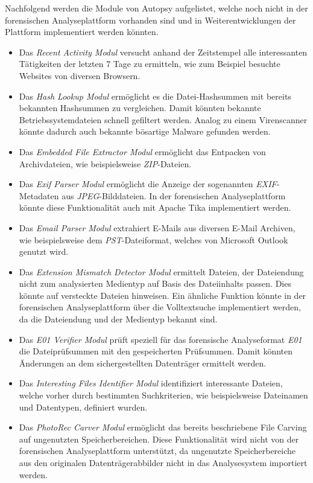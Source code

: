 \noindent
Nachfolgend werden die Module von Autopsy aufgelistet, welche noch nicht in der forensischen Analyseplattform vorhanden sind und in Weiterentwicklungen der Plattform implementiert werden könnten.
\begin{itemize}
\item Das \textit{Recent Activity Modul} versucht anhand der Zeitstempel alle interessanten Tätigkeiten der letzten 7 Tage zu ermitteln, wie zum Beispiel besuchte Websites von diversen Browsern.
\item Das \textit{Hash Lookup Modul} ermöglicht es die Datei-Hashsummen mit bereits bekannten Hashsummen zu vergleichen. Damit könnten bekannte Betriebssystemdateien schnell gefiltert werden. Analog zu einem Virenscanner könnte dadurch auch bekannte bösartige Malware gefunden werden.
\item Das \textit{Embedded File Extractor Modul} ermöglicht das Entpacken von Archivdateien, wie beispielsweise \textit{ZIP}-Dateien.
\item Das \textit{Exif Parser Modul} ermöglicht die Anzeige der sogenannten \textit{EXIF}-Metadaten aus \textit{JPEG}-Bilddateien. In der forensischen Analyseplattform könnte diese Funktionalität auch mit Apache Tika implementiert werden.
\item Das \textit{Email Parser Modul} extrahiert E-Mails aus diversen E-Mail Archiven, wie beispielsweise dem \textit{PST}-Dateiformat, welches von Microsoft Outlook genutzt wird.
\item Das \textit{Extension Mismatch Detector Modul} ermittelt Dateien, der Dateiendung nicht zum analysierten Medientyp auf Basis des Dateiinhalts passen. Dies könnte auf versteckte Dateien hinweisen. Ein ähnliche Funktion könnte in der forensischen Analyseplattform über die Volltextsuche implementiert werden, da die Dateiendung und der Medientyp bekannt sind.
\item Das \textit{E01 Verifier Modul} prüft speziell für das forensische Analyseformat \textit{E01} die Dateiprüfsummen mit den gespeicherten Prüfsummen. Damit könnten Änderungen an dem sichergestellten Datenträger ermittelt werden.
\item Das \textit{Interesting Files Identifier Modul} identifiziert interessante Dateien, welche vorher durch bestimmten Suchkriterien, wie beispielsweise Dateinamen und Datentypen, definiert wurden.
\item Das \textit{PhotoRec Carver Modul} ermöglicht das bereits beschriebene File Carving auf ungenutzten Speicherbereichen. Diese Funktionalität wird nicht von der forensischen Analyseplattform unterstützt, da ungenutzte Speicherbereiche aus den originalen Datenträgerabbilder nicht in das Analysesystem importiert werden.

\end{itemize}
